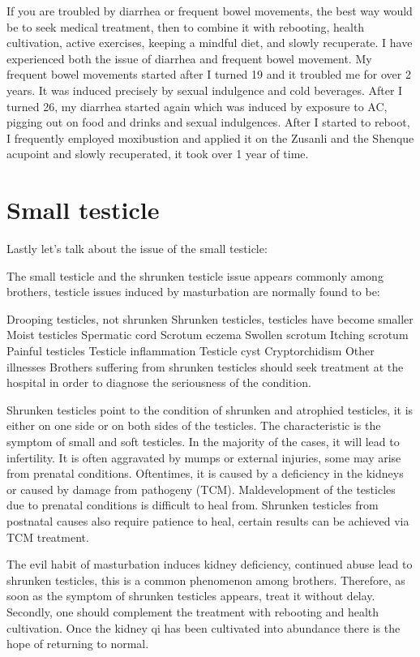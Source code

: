 \documentclass[
]{book}
\begin{document}
If you are troubled by diarrhea or frequent bowel movements, the best way would be to seek medical treatment, then to combine it with rebooting, health cultivation, active exercises, keeping a mindful diet, and slowly recuperate. I have experienced both the issue of diarrhea and frequent bowel movement. My frequent bowel movements started after I turned 19 and it troubled me for over 2 years. It was induced precisely by sexual indulgence and cold beverages. After I turned 26, my diarrhea started again which was induced by exposure to AC, pigging out on food and drinks and sexual indulgences. After I started to reboot, I frequently employed moxibustion and applied it on the Zusanli and the Shenque acupoint and slowly recuperated, it took over 1 year of time.

\hypertarget{small-testicle}{%
\section{Small testicle}\label{small-testicle}}

Lastly let's talk about the issue of the small testicle:

The small testicle and the shrunken testicle issue appears commonly among brothers, testicle issues induced by masturbation are normally found to be:

Drooping testicles, not shrunken
Shrunken testicles, testicles have become smaller
Moist testicles
Spermatic cord
Scrotum eczema
Swollen scrotum
Itching scrotum
Painful testicles
Testicle inflammation
Testicle cyst
Cryptorchidism
Other illnesses
Brothers suffering from shrunken testicles should seek treatment at the hospital in order to diagnose the seriousness of the condition.

Shrunken testicles point to the condition of shrunken and atrophied testicles, it is either on one side or on both sides of the testicles. The characteristic is the symptom of small and soft testicles. In the majority of the cases, it will lead to infertility. It is often aggravated by mumps or external injuries, some may arise from prenatal conditions. Oftentimes, it is caused by a deficiency in the kidneys or caused by damage from pathogeny (TCM). Maldevelopment of the testicles due to prenatal conditions is difficult to heal from. Shrunken testicles from postnatal causes also require patience to heal, certain results can be achieved via TCM treatment.

The evil habit of masturbation induces kidney deficiency, continued abuse lead to shrunken testicles, this is a common phenomenon among brothers. Therefore, as soon as the symptom of shrunken testicles appears, treat it without delay. Secondly, one should complement the treatment with rebooting and health cultivation. Once the kidney qi has been cultivated into abundance there is the hope of returning to normal.
\end{document}

